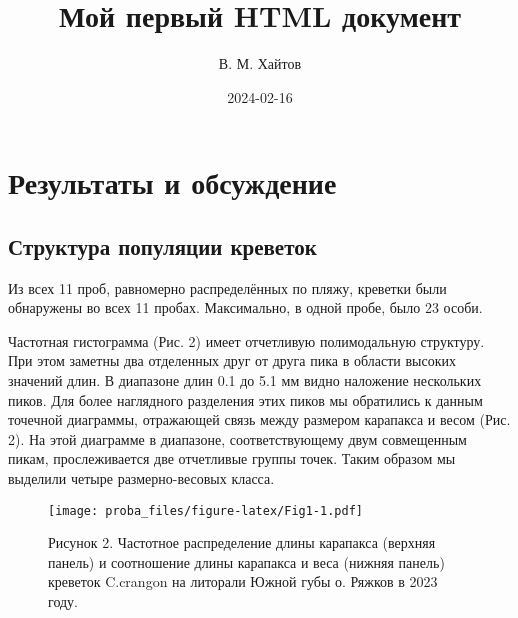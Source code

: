 \documentclass[
]{article}
\title{Мой первый HTML документ}
\author{В. М. Хайтов}
\date{2024-02-16}
\begin{document}
\maketitle

\hypertarget{ux440ux435ux437ux443ux43bux44cux442ux430ux442ux44b-ux438-ux43eux431ux441ux443ux436ux434ux435ux43dux438ux435}{%
\section{Результаты и
обсуждение}\label{ux440ux435ux437ux443ux43bux44cux442ux430ux442ux44b-ux438-ux43eux431ux441ux443ux436ux434ux435ux43dux438ux435}}

\hypertarget{ux441ux442ux440ux443ux43aux442ux443ux440ux430-ux43fux43eux43fux443ux43bux44fux446ux438ux438-ux43aux440ux435ux432ux435ux442ux43eux43a}{%
\subsection{Структура популяции
креветок}\label{ux441ux442ux440ux443ux43aux442ux443ux440ux430-ux43fux43eux43fux443ux43bux44fux446ux438ux438-ux43aux440ux435ux432ux435ux442ux43eux43a}}

Из всех 11 проб, равномерно распределённых по пляжу, креветки были
обнаружены во всех 11 пробах. Максимально, в одной пробе, было 23 особи.

Частотная гистограмма (Рис. 2) имеет отчетливую полимодальную структуру.
При этом заметны два отделенных друг от друга пика в области высоких
значений длин. В диапазоне длин 0.1 до 5.1 мм видно наложение нескольких
пиков. Для более наглядного разделения этих пиков мы обратились к данным
точечной диаграммы, отражающей связь между размером карапакса и весом
(Рис. 2). На этой диаграмме в диапазоне, соответствующему двум
совмещенным пикам, прослеживается две отчетливые группы точек. Таким
образом мы выделили четыре размерно-весовых класса.

\begin{figure}
\centering
\texttt{[image: proba\_files/figure-latex/Fig1-1.pdf]}
\caption{Рисунок 2. Частотное распределение длины карапакса (верхняя
панель) и соотношение длины карапакса и веса (нижняя панель) креветок
C.crangon на литорали Южной губы о. Ряжков в 2023 году.}
\end{figure}
\end{document}
